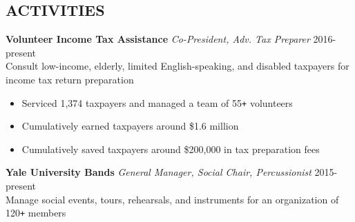 \documentclass[margin, centered]{res}
\def\Plus{\texttt{+}}
\begin{document}
\begin{resume}
  \section{ACTIVITIES}
  \textbf{Volunteer Income Tax Assistance} \textit{Co-President, Adv. Tax Preparer} \hfill 2016-present \\
  Consult low-income, elderly, limited English-speaking, and disabled taxpayers for income tax return preparation
  \begin{itemize}
    \item Serviced 1,374 taxpayers and managed a team of 55\Plus{} volunteers
    \item Cumulatively earned taxpayers around \$1.6 million
    \item Cumulatively saved taxpayers around \$200,000 in tax preparation fees
    \end{itemize}
  \textbf{Yale University Bands} \textit{General Manager, Social Chair, Percussionist} \hfill 2015-present \\
  Manage social events, tours, rehearsals, and instruments for an organization of 120\Plus{} members
\end{resume}
\end{document}
